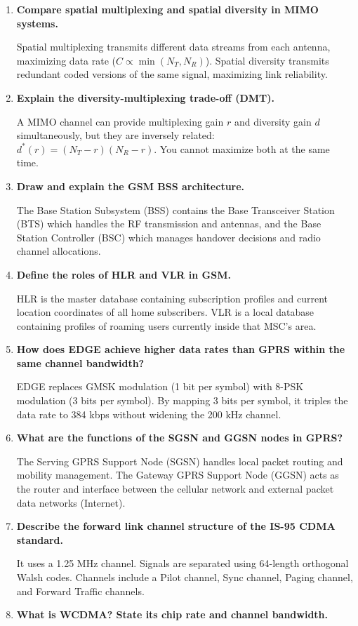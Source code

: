 \documentclass[12pt,a4paper]{article}
\newcommand{\Q}[1]{\textbf{#1}\par\noindent\ignorespaces}
\begin{document}
\begin{tcolorbox}[exambox, title={\textbf{Frequently Asked / Viva Questions}}]
\begin{enumerate}[topsep=0pt, label=\textbf{Q\arabic*.}, itemsep=5pt]
  \item \Q{Compare spatial multiplexing and spatial diversity in MIMO systems.}
    Spatial multiplexing transmits different data streams from each antenna, maximizing data rate ($C \propto \min(N_T, N_R)$). Spatial diversity transmits redundant coded versions of the same signal, maximizing link reliability.
  \item \Q{Explain the diversity-multiplexing trade-off (DMT).}
    A MIMO channel can provide multiplexing gain $r$ and diversity gain $d$ simultaneously, but they are inversely related: $d^*(r) = (N_T - r)(N_R - r)$. You cannot maximize both at the same time.
  \item \Q{Draw and explain the GSM BSS architecture.}
    The Base Station Subsystem (BSS) contains the Base Transceiver Station (BTS) which handles the RF transmission and antennas, and the Base Station Controller (BSC) which manages handover decisions and radio channel allocations.
  \item \Q{Define the roles of HLR and VLR in GSM.}
    HLR is the master database containing subscription profiles and current location coordinates of all home subscribers. VLR is a local database containing profiles of roaming users currently inside that MSC's area.
  \item \Q{How does EDGE achieve higher data rates than GPRS within the same channel bandwidth?}
    EDGE replaces GMSK modulation (1 bit per symbol) with 8-PSK modulation (3 bits per symbol). By mapping 3 bits per symbol, it triples the data rate to 384 kbps without widening the 200 kHz channel.
  \item \Q{What are the functions of the SGSN and GGSN nodes in GPRS?}
    The Serving GPRS Support Node (SGSN) handles local packet routing and mobility management. The Gateway GPRS Support Node (GGSN) acts as the router and interface between the cellular network and external packet data networks (Internet).
  \item \Q{Describe the forward link channel structure of the IS-95 CDMA standard.}
    It uses a 1.25 MHz channel. Signals are separated using 64-length orthogonal Walsh codes. Channels include a Pilot channel, Sync channel, Paging channel, and Forward Traffic channels.
  \item \Q{What is WCDMA? State its chip rate and channel bandwidth.}

\end{enumerate}
\end{tcolorbox}
\end{document}
